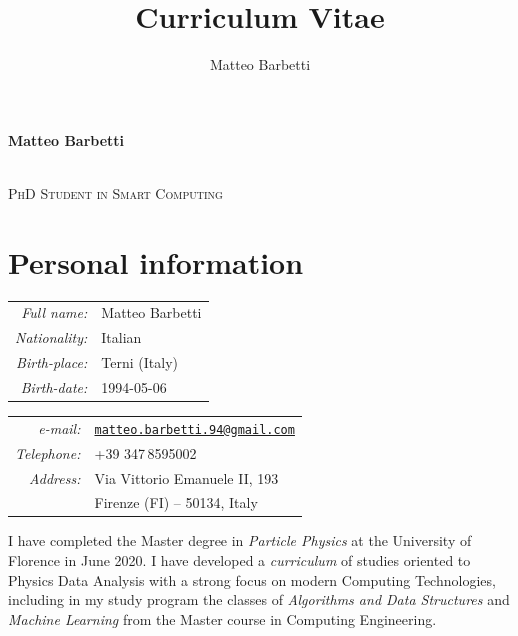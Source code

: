 \documentclass[a4, 11pt]{report}
\author{Matteo Barbetti}
\title{Curriculum Vitae}
\newcommand{\mail}[1]{\href{mailto:#1}{\texttt{#1}}}
\begin{document}
    \begin{center}
        \begin{Large}
            \textbf{Matteo Barbetti}
        \end{Large}\\[1mm]
        \textsc{PhD Student in Smart Computing}
    \end{center}
    
    \vskip 3mm
    
    \section*{Personal information}
        \begin{minipage}{0.45\textwidth}
            \begin{tabular}{rl}
                \textit{Full name:}   & Matteo Barbetti\\
                \textit{Nationality:} & {Italian}\\
                \textit{Birth-place:} & {Terni (Italy)}\\
                \textit{Birth-date:}  & {1994-05-06}\\          
            \end{tabular}
        \end{minipage}
        \hfill
        \begin{minipage}{0.5\textwidth}
            \begin{tabular}{rl}
                \textit{e-mail:}      & \mail{matteo.barbetti.94@gmail.com}\\
                \textit{Telephone:}   & +39\,\,347\,8595002\\
                \textit{Address:}     & Via Vittorio Emanuele II, 193\\
                                      & Firenze (FI) -- 50134, Italy\\
            \end{tabular}
        \end{minipage}

    \vskip 9mm

    \noindent
    I have completed the Master degree in \emph{Particle Physics} at the University of Florence in June 2020. I have developed a \emph{curriculum} of studies oriented to Physics Data Analysis with a strong focus on modern Computing Technologies, including in my study program the classes of \emph{Algorithms and Data Structures} and \emph{Machine Learning} from the Master course in Computing Engineering. 
\end{document}
